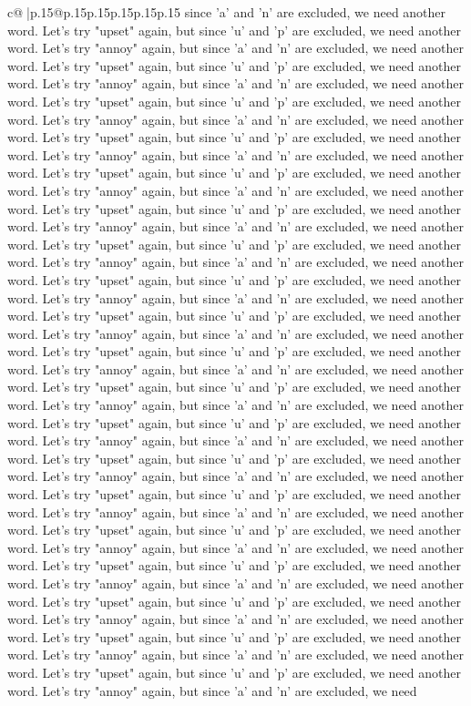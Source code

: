 \documentclass{article}
\begin{document}
{\begin{supertabular}{c@{$\;$}|p{.15\linewidth}@{}p{.15\linewidth}p{.15\linewidth}p{.15\linewidth}p{.15\linewidth}p{.15\linewidth}}
{{{since 'a' and 'n' are excluded, we need another word. Let's try "upset" again, but since 'u' and 'p' are excluded, we need another word. Let's try "annoy" again, but since 'a' and 'n' are excluded, we need another word. Let's try "upset" again, but since 'u' and 'p' are excluded, we need another word. Let's try "annoy" again, but since 'a' and 'n' are excluded, we need another word. Let's try "upset" again, but since 'u' and 'p' are excluded, we need another word. Let's try "annoy" again, but since 'a' and 'n' are excluded, we need another word. Let's try "upset" again, but since 'u' and 'p' are excluded, we need another word. Let's try "annoy" again, but since 'a' and 'n' are excluded, we need another word. Let's try "upset" again, but since 'u' and 'p' are excluded, we need another word. Let's try "annoy" again, but since 'a' and 'n' are excluded, we need another word. Let's try "upset" again, but since 'u' and 'p' are excluded, we need another word. Let's try "annoy" again, but since 'a' and 'n' are excluded, we need another word. Let's try "upset" again, but since 'u' and 'p' are excluded, we need another word. Let's try "annoy" again, but since 'a' and 'n' are excluded, we need another word. Let's try "upset" again, but since 'u' and 'p' are excluded, we need another word. Let's try "annoy" again, but since 'a' and 'n' are excluded, we need another word. Let's try "upset" again, but since 'u' and 'p' are excluded, we need another word. Let's try "annoy" again, but since 'a' and 'n' are excluded, we need another word. Let's try "upset" again, but since 'u' and 'p' are excluded, we need another word. Let's try "annoy" again, but since 'a' and 'n' are excluded, we need another word. Let's try "upset" again, but since 'u' and 'p' are excluded, we need another word. Let's try "annoy" again, but since 'a' and 'n' are excluded, we need another word. Let's try "upset" again, but since 'u' and 'p' are excluded, we need another word. Let's try "annoy" again, but since 'a' and 'n' are excluded, we need another word. Let's try "upset" again, but since 'u' and 'p' are excluded, we need another word. Let's try "annoy" again, but since 'a' and 'n' are excluded, we need another word. Let's try "upset" again, but since 'u' and 'p' are excluded, we need another word. Let's try "annoy" again, but since 'a' and 'n' are excluded, we need another word. Let's try "upset" again, but since 'u' and 'p' are excluded, we need another word. Let's try "annoy" again, but since 'a' and 'n' are excluded, we need another word. Let's try "upset" again, but since 'u' and 'p' are excluded, we need another word. Let's try "annoy" again, but since 'a' and 'n' are excluded, we need another word. Let's try "upset" again, but since 'u' and 'p' are excluded, we need another word. Let's try "annoy" again, but since 'a' and 'n' are excluded, we need another word. Let's try "upset" again, but since 'u' and 'p' are excluded, we need another word. Let's try "annoy" again, but since 'a' and 'n' are excluded, we need another word. Let's try "upset" again, but since 'u' and 'p' are excluded, we need another word. Let's try "annoy" again, but since 'a' and 'n' are excluded, we need }}}
\end{supertabular}}
\end{document}
